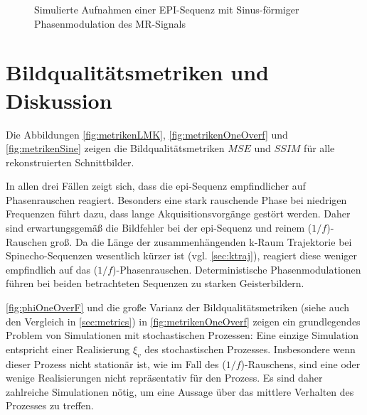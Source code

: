 \begin{figure}[H]
	\hfill
	\caption[Phasenmodulation (EPI-Sequenz)]{Simulierte Aufnahmen einer EPI-Sequenz mit Sinus-förmiger Phasenmodulation des MR-Signals}
	\label{fig:sinemodEPI}	
\end{figure}






\clearpage
\section{Bildqualitätsmetriken und Diskussion}
Die Abbildungen \ref{fig:metrikenLMK}, \ref{fig:metrikenOneOverf} und \ref{fig:metrikenSine} zeigen die Bildqualitätsmetriken $MSE$ und $SSIM$ für alle rekonstruierten Schnittbilder.

In allen drei Fällen zeigt sich, dass die \gls{epi}-Sequenz empfindlicher auf Phasenrauschen reagiert. Besonders eine stark rauschende Phase bei niedrigen Frequenzen führt dazu, dass lange Akquisitionsvorgänge gestört werden. Daher sind erwartungsgemäß die Bildfehler bei der \gls{epi}-Sequenz und reinem ($1/f$)-Rauschen groß. Da die Länge der zusammenhängenden k-Raum Trajektorie bei Spinecho-Sequenzen wesentlich kürzer ist (vgl. \autoref{sec:ktraj}), reagiert diese weniger empfindlich auf das ($1/f$)-Phasenrauschen. Deterministische Phasenmodulationen führen bei beiden betrachteten Sequenzen zu starken Geisterbildern.

\autoref{fig:phiOneOverF} und die große Varianz der Bildqualitätsmetriken (siehe auch den Vergleich in \autoref{sec:metrics}) in \autoref{fig:metrikenOneOverf} zeigen ein grundlegendes Problem von Simulationen mit stochastischen Prozessen: Eine einzige Simulation entspricht einer Realisierung $\xi_v$ des stochastischen Prozesses. Insbesondere wenn dieser Prozess nicht stationär ist, wie im Fall des ($1/f$)-Rauschens, sind eine oder wenige Realisierungen nicht repräsentativ für den Prozess. Es sind daher zahlreiche Simulationen nötig, um eine Aussage über das mittlere Verhalten des Prozesses zu treffen. 

\clearpage

